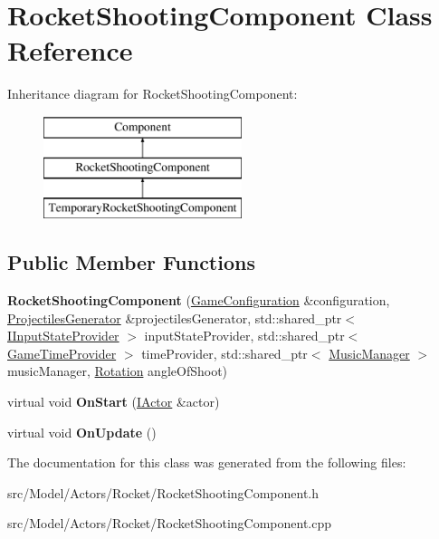 \hypertarget{classRocketShootingComponent}{}\section{Rocket\+Shooting\+Component Class Reference}
\label{classRocketShootingComponent}
Inheritance diagram for Rocket\+Shooting\+Component\+:\begin{figure}[H]
\begin{center}
\leavevmode
\includegraphics[height=3.000000cm]{classRocketShootingComponent}
\end{center}
\end{figure}
\subsection*{Public Member Functions}
\begin{DoxyCompactItemize}
\item 
{\bfseries Rocket\+Shooting\+Component} (\hyperlink{classGameConfiguration}{Game\+Configuration} \&configuration, \hyperlink{classProjectilesGenerator}{Projectiles\+Generator} \&projectiles\+Generator, std\+::shared\+\_\+ptr$<$ \hyperlink{classIInputStateProvider}{I\+Input\+State\+Provider} $>$ input\+State\+Provider, std\+::shared\+\_\+ptr$<$ \hyperlink{classGameTimeProvider}{Game\+Time\+Provider} $>$ time\+Provider, std\+::shared\+\_\+ptr$<$ \hyperlink{classMusicManager}{Music\+Manager} $>$ music\+Manager, \hyperlink{classRotation}{Rotation} angle\+Of\+Shoot)\hypertarget{classRocketShootingComponent_aec49d14d17bde16be8fad3a69e2c990a}{}\label{classRocketShootingComponent_aec49d14d17bde16be8fad3a69e2c990a}

\item 
virtual void {\bfseries On\+Start} (\hyperlink{classIActor}{I\+Actor} \&actor)\hypertarget{classRocketShootingComponent_a5f5f859f69496f55a9354819e2db83be}{}\label{classRocketShootingComponent_a5f5f859f69496f55a9354819e2db83be}

\item 
virtual void {\bfseries On\+Update} ()\hypertarget{classRocketShootingComponent_a77da7c968ae3fdaa7d5e7dd763eac5b9}{}\label{classRocketShootingComponent_a77da7c968ae3fdaa7d5e7dd763eac5b9}

\end{DoxyCompactItemize}


The documentation for this class was generated from the following files\+:\begin{DoxyCompactItemize}
\item 
src/\+Model/\+Actors/\+Rocket/Rocket\+Shooting\+Component.\+h\item 
src/\+Model/\+Actors/\+Rocket/Rocket\+Shooting\+Component.\+cpp\end{DoxyCompactItemize}
